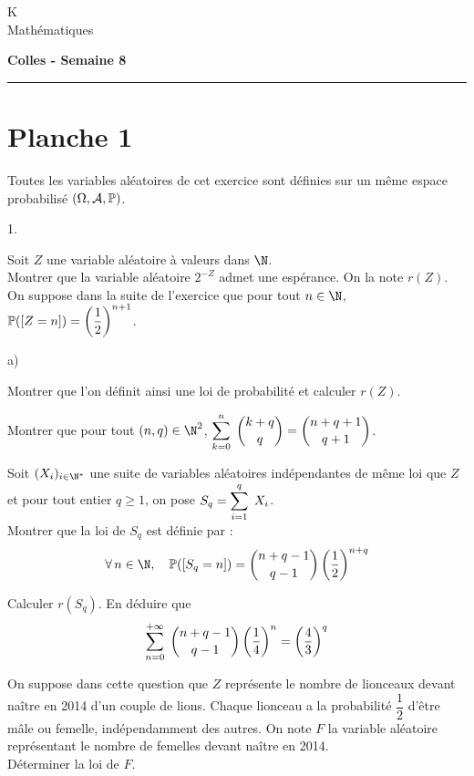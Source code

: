 \documentclass[11pt]{article}%
\begin{document}
\begin{flushleft}
K \\
Mathématiques
\end{flushleft}

\begin{center}
\textbf{\Large{Colles - Semaine 8}}
\end{center}

\hrule

\vspace*{0,2cm}

\section*{Planche 1}


\noindent
Toutes les variables aléatoires de  cet exercice sont définies
sur un même espace probabilisé $(\Omega,{\cal A},\mathbb{P})$.

\begin{noliste}{1.}
\item
Soit $Z$ une variable al\'{e}atoire \`{a} valeurs dans $\N$.\\ 
Montrer
que la variable al\'{e}atoire $2^{-Z}$ admet une esp\'{e}rance. On la
note $r(Z)$.\\
On suppose dans la suite de l'exercice   que pour tout $n\in \N$,
$\mathbb{P}(\left[ {Z=n} \right])=  \left( \dfrac{1}{2} \right)^{n+1}$.

\item
\begin{noliste}{a)}
\item
Montrer que l'on d\'{e}finit ainsi une  loi de probabilit\'{e} et
calculer $r(Z)$.
\item
Montrer que pour tout $(n,q)\in \N^2$, $ \displaystyle\sum\limits_{k=0}^{n}\hspace{.1cm}
\dbinom{k+q}{ q}= \dbinom{n+q+1}{ q+1}$.
\item
Soit $(X_i)_{i\in\N^*}$ une suite de variables al\'{e}atoires
indépendantes de même loi que $Z$ et pour tout entier $q\geq 1$,
on pose
$S_q =
\displaystyle\sum\limits_{i=1}^{q}\hspace{.1cm} X_i$.\\
Montrer que la loi de $S_q$ est d\'{e}finie par :
\[
\forall\, n \in \N,  \quad \Prob(\Ev{S_q=n})= \dbinom{n+q-1}{q-1}\left(
\dfrac12\right)^{n+q}
\]
\item
Calculer $r(S_q)$. En d\'{e}duire que
\[
\displaystyle\sum\limits_{n=0}^{+\infty}\hspace{.1cm} \dbinom{n+q-1}{ q-1} \left(
\dfrac{1}{4}\right)^{n} = \left( \dfrac{4}{3}\right)^q
\]
\end{noliste}
\item
On suppose dans cette question  que $Z$ représente le nombre de
lionceaux devant naître en 2014 d'un couple de lions. Chaque
lionceau a la probabilité $\dfrac{1}{2}$ d'être mâle ou 
femelle,
indépendamment des autres. On note $F$ la variable aléatoire
représentant le nombre de femelles devant naître en 2014.\\
Déterminer la loi de $F$.
\end{noliste}
\end{document}
